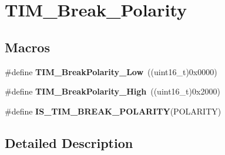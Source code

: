 \hypertarget{group___t_i_m___break___polarity}{\section{T\-I\-M\-\_\-\-Break\-\_\-\-Polarity}
\label{group___t_i_m___break___polarity}
}
\subsection*{Macros}
\begin{DoxyCompactItemize}
\item 
\hypertarget{group___t_i_m___break___polarity_ga565656ca81d17f9a1807afe3971dff6e}{\#define {\bfseries T\-I\-M\-\_\-\-Break\-Polarity\-\_\-\-Low}~((uint16\-\_\-t)0x0000)}\label{group___t_i_m___break___polarity_ga565656ca81d17f9a1807afe3971dff6e}

\item 
\hypertarget{group___t_i_m___break___polarity_gabd4b72079548fd8903413a348539542b}{\#define {\bfseries T\-I\-M\-\_\-\-Break\-Polarity\-\_\-\-High}~((uint16\-\_\-t)0x2000)}\label{group___t_i_m___break___polarity_gabd4b72079548fd8903413a348539542b}

\item 
\#define {\bfseries I\-S\-\_\-\-T\-I\-M\-\_\-\-B\-R\-E\-A\-K\-\_\-\-P\-O\-L\-A\-R\-I\-T\-Y}(P\-O\-L\-A\-R\-I\-T\-Y)
\end{DoxyCompactItemize}


\subsection{Detailed Description}


